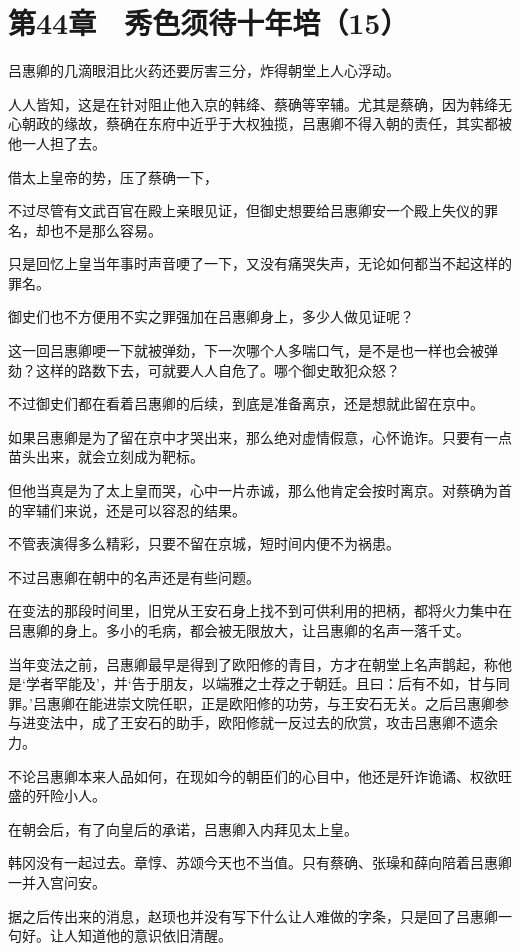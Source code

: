 \section{第44章　秀色须待十年培（15）}

吕惠卿的几滴眼泪比火药还要厉害三分，炸得朝堂上人心浮动。

人人皆知，这是在针对阻止他入京的韩绛、蔡确等宰辅。尤其是蔡确，因为韩绛无心朝政的缘故，蔡确在东府中近乎于大权独揽，吕惠卿不得入朝的责任，其实都被他一人担了去。

借太上皇帝的势，压了蔡确一下，

不过尽管有文武百官在殿上亲眼见证，但御史想要给吕惠卿安一个殿上失仪的罪名，却也不是那么容易。

只是回忆上皇当年事时声音哽了一下，又没有痛哭失声，无论如何都当不起这样的罪名。

御史们也不方便用不实之罪强加在吕惠卿身上，多少人做见证呢？

这一回吕惠卿哽一下就被弹劾，下一次哪个人多喘口气，是不是也一样也会被弹劾？这样的路数下去，可就要人人自危了。哪个御史敢犯众怒？

不过御史们都在看着吕惠卿的后续，到底是准备离京，还是想就此留在京中。

如果吕惠卿是为了留在京中才哭出来，那么绝对虚情假意，心怀诡诈。只要有一点苗头出来，就会立刻成为靶标。

但他当真是为了太上皇而哭，心中一片赤诚，那么他肯定会按时离京。对蔡确为首的宰辅们来说，还是可以容忍的结果。

不管表演得多么精彩，只要不留在京城，短时间内便不为祸患。

不过吕惠卿在朝中的名声还是有些问题。

在变法的那段时间里，旧党从王安石身上找不到可供利用的把柄，都将火力集中在吕惠卿的身上。多小的毛病，都会被无限放大，让吕惠卿的名声一落千丈。

当年变法之前，吕惠卿最早是得到了欧阳修的青目，方才在朝堂上名声鹊起，称他是‘学者罕能及’，并‘告于朋友，以端雅之士荐之于朝廷。且曰：后有不如，甘与同罪。’吕惠卿在能进崇文院任职，正是欧阳修的功劳，与王安石无关。之后吕惠卿参与进变法中，成了王安石的助手，欧阳修就一反过去的欣赏，攻击吕惠卿不遗余力。

不论吕惠卿本来人品如何，在现如今的朝臣们的心目中，他还是歼诈诡谲、权欲旺盛的歼险小人。

在朝会后，有了向皇后的承诺，吕惠卿入内拜见太上皇。

韩冈没有一起过去。章惇、苏颂今天也不当值。只有蔡确、张璪和薛向陪着吕惠卿一并入宫问安。

据之后传出来的消息，赵顼也并没有写下什么让人难做的字条，只是回了吕惠卿一句好。让人知道他的意识依旧清醒。

